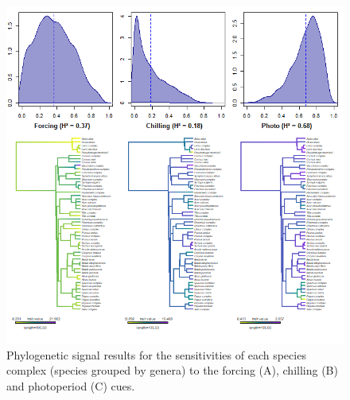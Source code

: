 \documentclass{article}\usepackage[]{graphicx}\usepackage[]{color}
\begin{document}
  
\begin{figure} [H]
  \begin{center}
  \includegraphics[width=14cm]{..//..//analyses/phylogeny/figures/Sensitivities_phylosig.png}
  \caption{Phylogenetic signal results for the sensitivities of each species complex (species grouped by genera) to the forcing (A), chilling (B) and photoperiod (C) cues.}
  \label{fig:phylosig_complex}
\end{center}
\end{figure}
\end{document}
